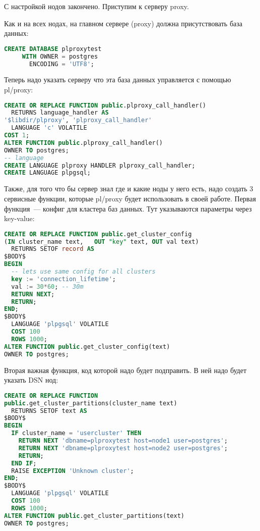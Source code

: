 С настройкой нодов закончено. Приступим к серверу proxy.

Как и на всех нодах, на главном сервере (proxy) должна присутствовать база данных:

\begin{lstlisting}[language=SQL,label=lst:plproxy5,caption=Настройка]
CREATE DATABASE plproxytest
     WITH OWNER = postgres
       ENCODING = 'UTF8';
\end{lstlisting}

Теперь надо указать серверу что эта база данных управляется с помощью pl/proxy:

\begin{lstlisting}[language=SQL,label=lst:plproxy6,caption=Настройка]
CREATE OR REPLACE FUNCTION public.plproxy_call_handler()
  RETURNS language_handler AS
'$libdir/plproxy', 'plproxy_call_handler'
  LANGUAGE 'c' VOLATILE
COST 1;
ALTER FUNCTION public.plproxy_call_handler()
OWNER TO postgres;
-- language
CREATE LANGUAGE plproxy HANDLER plproxy_call_handler;
CREATE LANGUAGE plpgsql;
\end{lstlisting}

Также, для того что бы сервер знал где и какие ноды у него есть, надо создать 3 сервисные функции, которые pl/proxy будет использовать в своей работе. Первая функция~--- конфиг для кластера баз данных. Тут указываются параметры через key-value:

\begin{lstlisting}[language=SQL,label=lst:plproxy7,caption=Настройка]
CREATE OR REPLACE FUNCTION public.get_cluster_config
(IN cluster_name text,   OUT "key" text, OUT val text)
  RETURNS SETOF record AS
$BODY$
BEGIN
  -- lets use same config for all clusters
  key := 'connection_lifetime';
  val := 30*60; -- 30m
  RETURN NEXT;
  RETURN;
END;
$BODY$
  LANGUAGE 'plpgsql' VOLATILE
  COST 100
  ROWS 1000;
ALTER FUNCTION public.get_cluster_config(text)
OWNER TO postgres;
\end{lstlisting}

Вторая важная функция, код которой надо будет подправить. В ней надо будет указать DSN нод:

\begin{lstlisting}[language=SQL,label=lst:plproxy8,caption=Настройка]
CREATE OR REPLACE FUNCTION
public.get_cluster_partitions(cluster_name text)
  RETURNS SETOF text AS
$BODY$
BEGIN
  IF cluster_name = 'usercluster' THEN
    RETURN NEXT 'dbname=plproxytest host=node1 user=postgres';
    RETURN NEXT 'dbname=plproxytest host=node2 user=postgres';
    RETURN;
  END IF;
  RAISE EXCEPTION 'Unknown cluster';
END;
$BODY$
  LANGUAGE 'plpgsql' VOLATILE
  COST 100
  ROWS 1000;
ALTER FUNCTION public.get_cluster_partitions(text)
OWNER TO postgres;
\end{lstlisting}

